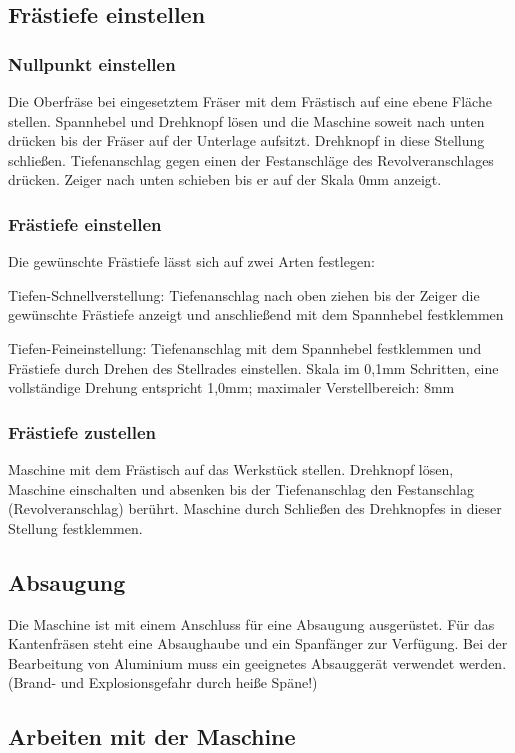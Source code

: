 \documentclass{\basedir/fablab-document}
\begin{document}
\subsection{Frästiefe einstellen}
\subsubsection{Nullpunkt einstellen}
Die Oberfräse bei eingesetztem Fräser mit dem Frästisch auf eine ebene Fläche stellen.
Spannhebel und Drehknopf lösen und die Maschine soweit nach unten drücken bis der Fräser auf der Unterlage aufsitzt. Drehknopf in diese Stellung schließen.
Tiefenanschlag gegen einen der Festanschläge des Revolveranschlages drücken.
Zeiger nach unten schieben bis er auf der Skala 0mm anzeigt.

\subsubsection{Frästiefe einstellen}
Die gewünschte Frästiefe lässt sich auf zwei Arten festlegen:

Tiefen-Schnellverstellung: Tiefenanschlag nach oben ziehen bis der Zeiger die gewünschte Frästiefe anzeigt und anschließend mit dem Spannhebel festklemmen

Tiefen-Feineinstellung: Tiefenanschlag mit dem Spannhebel festklemmen und Frästiefe durch Drehen des Stellrades einstellen. Skala im 0,1mm Schritten, eine vollständige Drehung entspricht 1,0mm; maximaler Verstellbereich: 8mm

\subsubsection{Frästiefe zustellen}
Maschine mit dem Frästisch auf das Werkstück stellen. Drehknopf lösen, Maschine einschalten und absenken bis der Tiefenanschlag den Festanschlag (Revolveranschlag) berührt. Maschine durch Schließen des Drehknopfes in dieser Stellung festklemmen.

\subsection{Absaugung}
Die Maschine ist mit einem Anschluss für eine Absaugung ausgerüstet. Für das Kantenfräsen steht eine Absaughaube und ein Spanfänger zur Verfügung. 
Bei der Bearbeitung von Aluminium muss ein geeignetes Absauggerät verwendet werden. (Brand- und Explosionsgefahr durch heiße Späne!)

\subsection{Arbeiten mit der Maschine}
\end{document}
